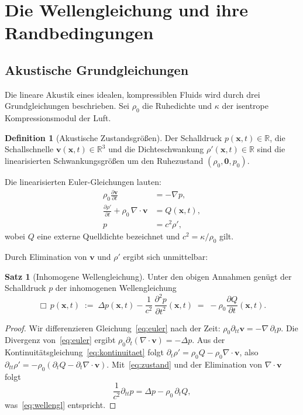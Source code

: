 ﻿\documentclass[12pt, a4paper]{article}
\theoremstyle{definition}
\newtheorem{definition}{Definition}[section]
\newtheorem{satz}{Satz}[section]
\theoremstyle{remark}
\newcommand{\R}{\mathbb{R}}
\newcommand{\pfrac}[2]{\frac{\partial #1}{\partial #2}}
\begin{document}
\section{Die Wellengleichung und ihre Randbedingungen}
\label{sec:wellengleichung}

\subsection{Akustische Grundgleichungen}

Die lineare Akustik eines idealen, kompressiblen Fluids wird durch drei
Grundgleichungen beschrieben. Sei $\rho_0$ die Ruhedichte und $\kappa$
der isentrope Kompressionsmodul der Luft.

\begin{definition}[Akustische Zustandsgrößen]
Der Schalldruck $p(\mathbf{x},t) \in \R$, die Schallschnelle
$\mathbf{v}(\mathbf{x},t) \in \R^3$ und die Dichteschwankung
$\rho'(\mathbf{x},t) \in \R$ sind die linearisierten Schwankungsgrößen
um den Ruhezustand $(\rho_0, \mathbf{0}, p_0)$.
\end{definition}

Die linearisierten Euler-Gleichungen lauten:
\begin{align}
  \rho_0 \pfrac{\mathbf{v}}{t} &= -\nabla p,
  \label{eq:euler}\\[6pt]
  \pfrac{\rho'}{t} + \rho_0\, \nabla \cdot \mathbf{v} &= Q(\mathbf{x},t),
  \label{eq:kontinuitaet}\\[6pt]
  p &= c^2 \rho',
  \label{eq:zustand}
\end{align}
wobei $Q$ eine externe Quelldichte bezeichnet und
$c^2 = \kappa / \rho_0$ gilt.

Durch Elimination von $\mathbf{v}$ und $\rho'$ ergibt sich unmittelbar:

\begin{satz}[Inhomogene Wellengleichung]
\label{satz:welle}
Unter den obigen Annahmen genügt der Schalldruck $p$ der inhomogenen
Wellengleichung
\begin{equation}
  \Box\, p(\mathbf{x},t) \;:=\;
  \Delta p(\mathbf{x},t) - \frac{1}{c^2}\,\pfrac{^2 p}{t^2}(\mathbf{x},t)
  \;=\; -\rho_0 \pfrac{Q}{t}(\mathbf{x},t).
  \label{eq:wellengl}
\end{equation}
\end{satz}

\begin{proof}
Wir differenzieren Gleichung~\eqref{eq:euler} nach der Zeit:
$\rho_0 \partial_{tt} \mathbf{v} = -\nabla\,\partial_t p.$
Die Divergenz von~\eqref{eq:euler} ergibt
$\rho_0 \partial_t (\nabla \cdot \mathbf{v}) = -\Delta p.$
Aus der Kontinuitätsgleichung~\eqref{eq:kontinuitaet} folgt
$\partial_t \rho' = \rho_0 Q - \rho_0 \nabla\cdot\mathbf{v}$,
also $\partial_{tt}\rho' = -\rho_0(\partial_t Q - \partial_t\nabla\cdot\mathbf{v}).$
Mit~\eqref{eq:zustand} und der Elimination von $\nabla\cdot\mathbf{v}$ folgt
\[
  \frac{1}{c^2}\partial_{tt} p = \Delta p - \rho_0\, \partial_t Q,
\]
was~\eqref{eq:wellengl} entspricht. 
\end{proof}
\end{document}
